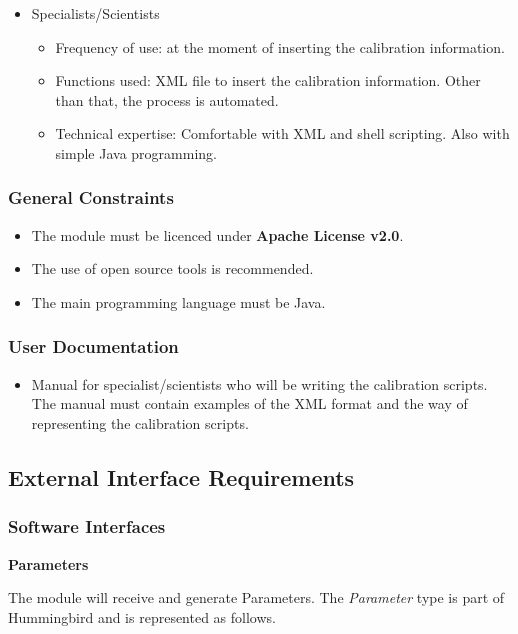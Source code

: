 \begin{itemize}
\item Specialists/Scientists
\begin{itemize}
\item Frequency of use: at the moment of inserting the calibration information.
\item Functions used: XML file to insert the calibration information. Other than that, the process is automated.
\item Technical expertise: Comfortable with XML and shell scripting. Also with simple Java programming.
\end{itemize}
\end{itemize}


\subsubsection{General Constraints}

\begin{itemize}
\item The module must be licenced under \textbf{Apache License v2.0}\cite{AL20}.
\item The use of open source tools is recommended.
\item The main programming language must be Java\cite{Java}.
\end{itemize}

\subsubsection{User Documentation}
\begin{itemize}
\item Manual for specialist/scientists who will be writing the calibration scripts. The manual must contain examples of the XML format and the way of representing the calibration scripts.
\end{itemize}

\pagebreak
\subsection{External Interface Requirements}

\subsubsection{Software Interfaces}

\textbf{Parameters}

The module will receive and generate Parameters. The \emph{Parameter} type is part of Hummingbird and is represented as follows.

